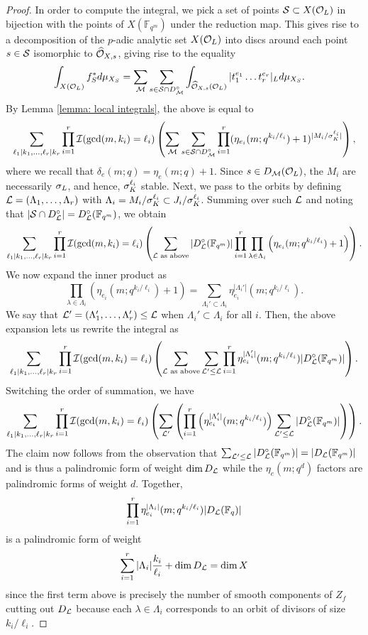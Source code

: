 \documentclass[10pt]{article}
\theoremstyle{plain}
\theoremstyle{definition}
\numberwithin{equation}{section}
\begin{document}
\begin{proof}
In order to compute the integral, we pick a set of points ${\mathcal S} \subset X({{\mathcal O}_{L}})$ in bijection with the points of $X(\mathbb F_{q^m})$ under the reduction map. This gives rise to a decomposition of the $p$-adic analytic set $X({{\mathcal O}_{L}})$ into discs around each point $s \in {\mathcal S}$ isomorphic to $\widehat{{\mathcal O}}_{X,s}$, giving rise to the equality 
\begin{align*}
    \int_{X({{\mathcal O}_{L}})}f_{S}^{*}d\mu_{X_S} &= \sum_{{\mathcal M}}\sum_{s \in {\mathcal S}\cap D_{{\mathcal M}}^\circ}\int_{\widehat{{\mathcal O}}_{X,s}({{\mathcal O}_{L}})}|t_1^{e_1}\dots t_r^{e_r}|_{{L}}d\mu_{X_S}.
\end{align*}
By Lemma \ref{lemma: local integrals}, the above is equal to
\[\sum_{\ell_1|k_1,\dots,\ell_r|k_r}\prod_{i=1}^r{\mathcal I}(\gcd(m,k_i) = \ell_i)\left(\sum_{{\mathcal M}}\sum_{s \in {\mathcal S} \cap D_{{\mathcal M}}^\circ}\prod_{i=1}^{r}(\eta_{e_i}(m;q^{k_i/\ell_i})+1)^{|M_i/\sigma_K^{\ell_i}|}\right),\]
where we recall that $\delta_e(m;q) = \eta_{e}(m;q)+1$. Since $s \in D_{\mathcal M}({{\mathcal O}_{L}})$, the $M_i$ are necessarily $\sigma_L$, and hence, $\sigma_K^{\ell_i}$ stable. Next, we pass to the orbits by defining ${\mathcal L} = (\Lambda_1,\dots,\Lambda_r)$ with $ \Lambda_i = M_i/\sigma_K^{\ell_i} \subset J_i/\sigma_K^{\ell_i}$. Summing over such ${\mathcal L}$ and noting that $|{\mathcal S} \cap D_{\mathcal L}^\circ| = D_{\mathcal L}^\circ(\mathbb F_{q^m})$, we obtain
\[\sum_{\ell_1|k_1,\dots,\ell_r|k_r}\prod_{i=1}^r{\mathcal I}(\gcd(m,k_i) = \ell_i)\left(\sum_{{\mathcal L} \text{ as above}}\left|D^\circ_{{\mathcal L}}(\mathbb F_{q^m})\right|\prod_{i=1}^{r}\prod_{\lambda \in \Lambda_i}\left(\eta_{e_i}(m;q^{k_i/\ell_i})+1\right) \right).\]
We now expand the inner product as
\[\prod_{\lambda \in \Lambda_i}\left(\eta_{e_i}(m;q^{k_i/\ell_i})+1\right) = \sum_{\Lambda_i' \subset \Lambda_i}\eta_{e_i}^{|\Lambda_i'|}(m;q^{k_i/\ell_i}).\]
We say that ${\mathcal L}' = (\Lambda_1',\dots,\Lambda_r') \leq {\mathcal L}$ when $\Lambda_i' \subset \Lambda_i$ for all $i$. Then, the above expansion lets us rewrite the integral as
\[\sum_{\ell_1|k_1,\dots,\ell_r|k_r}\prod_{i=1}^r{\mathcal I}(\gcd(m,k_i) = \ell_i)\left(\sum_{{\mathcal L} \text{ as above}}\sum_{{\mathcal L}' \leq {\mathcal L}}\prod_{i=1}^{r}\eta_{e_i}^{|\Lambda_i'|}(m;q^{k_i/\ell_i})|D^\circ_{{\mathcal L}}(\mathbb F_{q^m})|\right).\]
Switching the order of summation, we have
\[\sum_{\ell_1|k_1,\dots,\ell_r|k_r}\prod_{i=1}^r{\mathcal I}(\gcd(m,k_i) = \ell_i)\left(\sum_{{\mathcal L}'}\left(\prod_{i=1}^{r}\left(\eta_{e_i}^{|\Lambda_i'|}(m;q^{k_i/\ell_i})\right) \sum_{{\mathcal L}' \leq {\mathcal L}}|D^\circ_{{\mathcal L}}(\mathbb F_{q^m})|\right)\right).\]
The claim now follows from the observation that $\sum_{{\mathcal L}' \leq {\mathcal L}}|D^\circ_{{\mathcal L}}(\mathbb F_{q^m})| = |D_{{\mathcal L}}(\mathbb F_{q^m})|$ and is thus a palindromic form of weight $\dim D_{{\mathcal L}}$ while the $\eta_e(m;q^d)$ factors are palindromic forms of weight $d$. Together, 
\[\prod_{i=1}^{r}\eta_{e_i}^{|\Lambda_i|}(m;q^{k_i/\ell_i})|D_{{\mathcal L}}(\mathbb F_q)|\]
is a palindromic form of weight \[\sum_{i=1}^r|\Lambda_i|\frac{k_i}{\ell_i} + \dim D_{\mathcal L} = \dim X\]
since the first term above is precisely the number of smooth components of $Z_f$ cutting out $D_{\mathcal L}$ because each $\lambda \in \Lambda_i$ corresponds to an orbit of divisors of size $k_i/\ell_i$. 


\end{proof}
\end{document}
